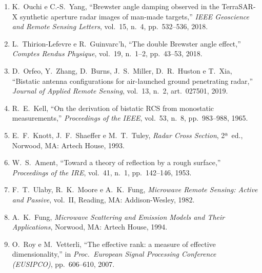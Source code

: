 \documentclass[12pt,a4paper,oneside]{book}
\theoremstyle{remark}
\theoremstyle{plain}
\theoremstyle{definition}
\begin{document}
\begin{enumerate}
  \item \label{ref:ouchi2018}
  K.\ Ouchi e C.-S.\ Yang, ``Brewster angle damping observed in the
  TerraSAR-X synthetic aperture radar images of man-made targets,''
  \textit{IEEE Geoscience and Remote Sensing Letters}, vol.\ 15, n.\ 4,
  pp.\ 532--536, 2018.

  \item \label{ref:thirion2018}
  L.\ Thirion-Lefevre e R.\ Guinvarc'h, ``The double Brewster angle
  effect,'' \textit{Comptes Rendus Physique}, vol.\ 19, n.\ 1--2,
  pp.\ 43--53, 2018.

  \item \label{ref:orfeo2019}
  D.\ Orfeo, Y.\ Zhang, D.\ Burns, J.\ S.\ Miller, D.\ R.\ Huston e T.\ Xia,
  ``Bistatic antenna configurations for air-launched ground penetrating
  radar,'' \textit{Journal of Applied Remote Sensing}, vol.\ 13, n.\ 2,
  art.\ 027501, 2019.



  \item \label{ref:kell1965}
  R.\ E.\ Kell, ``On the derivation of bistatic RCS from monostatic
  measurements,'' \textit{Proceedings of the IEEE}, vol.\ 53, n.\ 8,
  pp.\ 983--988, 1965.

  \item \label{ref:knott1993}
  E.\ F.\ Knott, J.\ F.\ Shaeffer e M.\ T.\ Tuley, \textit{Radar Cross
  Section}, 2ª~ed., Norwood, MA: Artech House, 1993.

  \item \label{ref:ament1953}
  W.\ S.\ Ament, ``Toward a theory of reflection by a rough surface,''
  \textit{Proceedings of the IRE}, vol.\ 41, n.\ 1, pp.\ 142--146, 1953.

  \item \label{ref:ulaby1982}
  F.\ T.\ Ulaby, R.\ K.\ Moore e A.\ K.\ Fung, \textit{Microwave Remote
  Sensing: Active and Passive}, vol.\ II, Reading, MA: Addison-Wesley, 1982.

  \item \label{ref:fung1994}
  A.\ K.\ Fung, \textit{Microwave Scattering and Emission Models and Their
  Applications}, Norwood, MA: Artech House, 1994.

  \item \label{ref:roy2007}
  O.\ Roy e M.\ Vetterli, ``The effective rank: a measure of effective
  dimensionality,'' in \textit{Proc.\ European Signal Processing Conference
  (EUSIPCO)}, pp.\ 606--610, 2007.


\end{enumerate}
\end{document}
